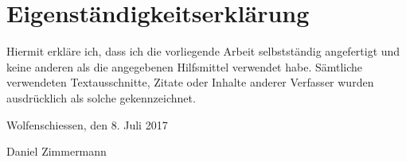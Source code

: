 \chapter*{Eigenständigkeitserklärung}

Hiermit erkläre ich, dass ich die vorliegende Arbeit selbstständig angefertigt und keine anderen als die
angegebenen Hilfsmittel verwendet habe. Sämtliche verwendeten Textausschnitte, Zitate oder Inhalte anderer
Verfasser wurden ausdrücklich als solche gekennzeichnet.

\vskip 1cm


Wolfenschiessen, den 8. Juli 2017

\vskip 1.5cm

Daniel Zimmermann